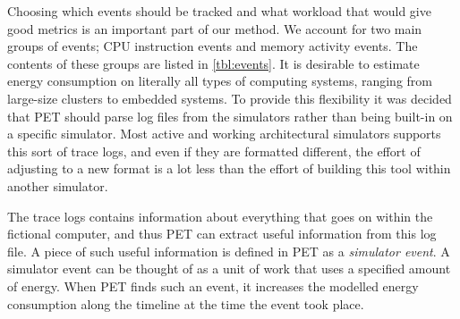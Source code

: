 Choosing which events should be tracked and what workload that would give good
metrics is an important part of our method. We account for two main groups of
events; CPU instruction events and memory activity events. The contents of these
groups are listed in \autoref{tbl:events}. It is desirable to estimate energy
consumption on literally all types of computing systems, ranging from large-size
clusters to embedded systems. To provide this flexibility it was decided that
PET should parse log files from the simulators rather than being built-in on a
specific simulator. Most active and working architectural simulators supports this
sort of trace logs, and even if they are formatted different, the effort of
adjusting to a new format is a lot less than the effort of building this tool
within another simulator.

The trace logs contains information about everything that goes on within the
fictional computer, and thus PET can extract useful information from this log
file. A piece of such useful information is defined in PET as a \emph{simulator
event}. A simulator event can be thought of as a unit of work that uses a
specified amount of energy. When PET finds such an event, it increases the
modelled energy consumption along the timeline at the time the event took place.

